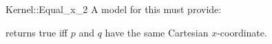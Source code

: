 \begin{ccRefFunctionObjectConcept}{Kernel::Equal_x_2}
A model for this must provide:


{returns true iff $p$ and $q$ have the same Cartesian $x$-coordinate.}

\ccIsModel{}

\end{ccRefFunctionObjectConcept}

